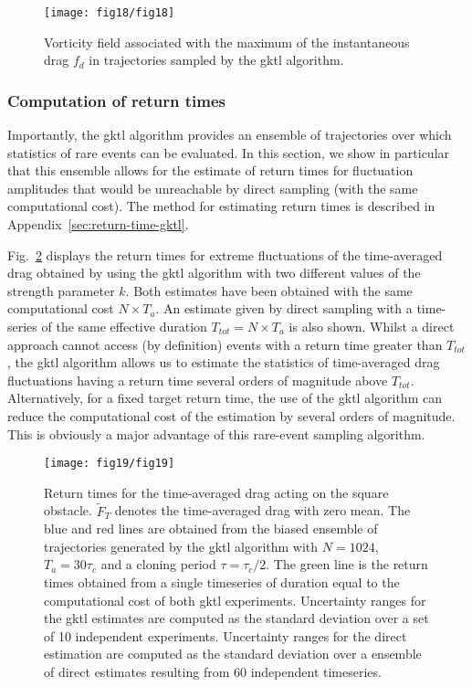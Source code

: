 \begin{figure}
	\centering
	\texttt{[image: fig18/fig18]}
	\caption{Vorticity field associated with the maximum of the instantaneous drag $f_d$ in  trajectories sampled by the \ac{gktl} algorithm.}
	\label{fig:illustr_extrms_vorticity_GKTL}
\end{figure}


\subsubsection{Computation of return times}
\label{sec:return_times}

Importantly, the \ac{gktl} algorithm provides an ensemble of trajectories over which statistics of rare events can be evaluated. In this section, we show in particular that this ensemble allows for the estimate of return times for fluctuation amplitudes that would be unreachable by direct sampling (with the same computational cost). The method for estimating return times is described in Appendix~\ref{sec:return-time-gktl}.
%

Fig.~\ref{fig:return_times_gktl} displays the return times for extreme fluctuations of the time-averaged drag obtained by using the \ac{gktl} algorithm with two different values of the strength parameter $k$.  
%
Both estimates have been obtained with the same computational cost $N\times T_a$.
An estimate given by direct sampling with a time-series of the same effective duration $T_{tot}=N\times T_a$ is also shown. 
Whilst a direct approach cannot access (by definition) events with a return time greater than $T_{tot}$, the \ac{gktl} algorithm allows us to estimate the statistics of time-averaged drag fluctuations having a return time several orders of magnitude above $T_{tot}$. Alternatively, for a fixed target return time, the use of the \ac{gktl} algorithm can reduce the computational cost of the estimation by several orders of magnitude. This is  obviously a major advantage of this rare-event sampling algorithm. 
%
\begin{figure}
	\centering
	\texttt{[image: fig19/fig19]}
	\caption{\label{fig:return_times_gktl} Return times for the time-averaged drag acting on the square obstacle. $\tilde{F}_T$ denotes the time-averaged drag with zero mean. The blue and red lines are obtained from the biased ensemble of trajectories generated by the \ac{gktl} algorithm with $N=1024$, $T_a=30\tau_c$ and a cloning period $\tau=\tau_c/2$. The green line is the return times obtained from a single timeseries of duration equal to the computational cost of both \ac{gktl} experiments. Uncertainty ranges for the \ac{gktl} estimates are computed as the standard deviation over a set of 10 independent experiments. Uncertainty ranges for the direct estimation are computed as the standard deviation over a ensemble of direct estimates resulting from 60 independent timeseries.}
\end{figure}